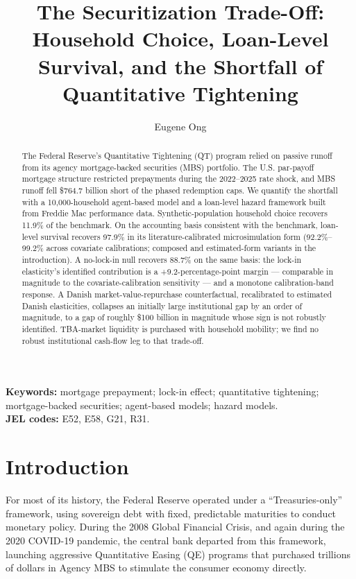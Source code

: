 \documentclass[12pt]{article}
\title{The Securitization Trade-Off: Household Choice, Loan-Level Survival, and the Shortfall of Quantitative Tightening}
\author{Eugene Ong}
\affil{Carnegie Mellon University}
\date{}
\begin{document}
\maketitle
\begin{abstract}
\noindent The Federal Reserve's Quantitative Tightening (QT) program relied on passive runoff from its agency mortgage-backed securities (MBS) portfolio. The U.S. par-payoff mortgage structure restricted prepayments during the 2022--2025 rate shock, and MBS runoff fell \$764.7 billion short of the phased redemption caps. We quantify the shortfall with a 10,000-household agent-based model and a loan-level hazard framework built from Freddie Mac performance data. Synthetic-population household choice recovers 11.9\% of the benchmark. On the accounting basis consistent with the benchmark, loan-level survival recovers 97.9\% in its literature-calibrated microsimulation form (92.2\%--99.2\% across covariate calibrations; composed and estimated-form variants in the introduction). A no-lock-in null recovers 88.7\% on the same basis: the lock-in elasticity's identified contribution is a +9.2-percentage-point margin --- comparable in magnitude to the covariate-calibration sensitivity --- and a monotone calibration-band response. A Danish market-value-repurchase counterfactual, recalibrated to estimated Danish elasticities, collapses an initially large institutional gap by an order of magnitude, to a gap of roughly \$100 billion in magnitude whose sign is not robustly identified. TBA-market liquidity is purchased with household mobility; we find no robust institutional cash-flow leg to that trade-off.
\end{abstract}

\vspace{0.5\baselineskip}
{\footnotesize\noindent\textbf{Keywords:} mortgage prepayment; lock-in effect; quantitative tightening; mortgage-backed securities; agent-based models; hazard models.\\
\textbf{JEL codes:} E52, E58, G21, R31.\par}

\section{Introduction}\label{sec:intro}

For most of its history, the Federal Reserve operated under a ``Treasuries-only'' framework, using sovereign debt with fixed, predictable maturities to conduct monetary policy. During the 2008 Global Financial Crisis, and again during the 2020 COVID-19 pandemic, the central bank departed from this framework, launching aggressive Quantitative Easing (QE) programs that purchased trillions of dollars in Agency MBS to stimulate the consumer economy directly.
\end{document}
